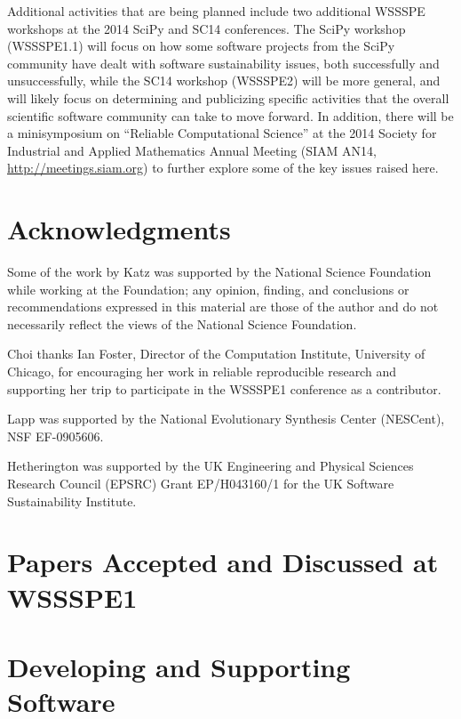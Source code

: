 \documentclass[11pt, oneside]{amsart}
\newcommand{\todo}[1]{{\color{blue}$\blacksquare$~\textsf{[TODO: #1]}}}
\begin{document}
Additional activities that are being planned include
two additional WSSSPE workshops at the 2014 SciPy and SC14 conferences.
The SciPy workshop (WSSSPE1.1) will focus on how some software projects
from the SciPy community have dealt with software sustainability issues, both
successfully and unsuccessfully, while the SC14 workshop (WSSSPE2) will
be more general, and will likely focus on determining and publicizing specific
activities that the overall scientific software community can take to move forward.
In addition, there will be a minisymposium on ``Reliable Computational Science''
at the 2014 Society for Industrial and Applied Mathematics  
Annual Meeting (SIAM AN14, \url{http://meetings.siam.org})
to further explore some of the key issues raised here.




\section*{Acknowledgments}


Some of the work by Katz was
supported by the National Science Foundation while working at the
Foundation; any opinion, finding, and conclusions or recommendations
expressed in this material are those of the author and do not
necessarily reflect the views of the National Science Foundation.


Choi thanks Ian Foster, Director of the Computation Institute, University of Chicago,
for encouraging her work in reliable reproducible research and
supporting her trip to participate in the WSSSPE1 conference as a contributor.

Lapp was supported by the National Evolutionary Synthesis Center (NESCent),
NSF EF-0905606.

Hetherington was supported by the UK Engineering and
Physical Sciences Research Council (EPSRC) Grant EP/H043160/1 for the
UK Software Sustainability Institute.



\appendix
\section{Papers Accepted and Discussed at WSSSPE1} \label{sec:papers}

\section*{Developing and Supporting Software}
\end{document}
